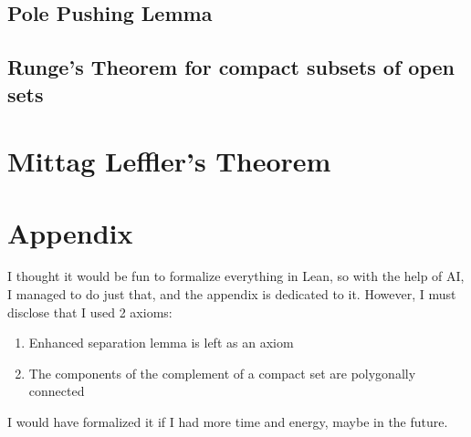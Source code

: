 \documentclass[11pt]{article}
\begin{document}
\subsection{Pole Pushing Lemma}
\subsection{Runge's Theorem for compact subsets of open sets}
\section{Mittag Leffler's Theorem}
\section{Appendix}
I thought it would be fun to formalize everything in Lean, so with the help of AI, I managed to do
just that, and the appendix is dedicated to it. However, I must disclose that I used 2 axioms:
\begin{enumerate}
\item Enhanced separation lemma is left as an axiom
\item The components of the complement of a compact set are polygonally connected
\end{enumerate}
I would have formalized it if I had more time and energy, maybe in the future.
\end{document}
